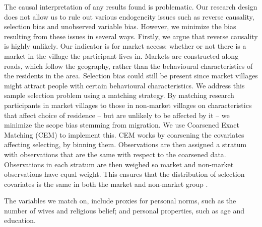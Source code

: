 The causal interpretation of any results found is problematic. Our research design does not allow us to  rule out various endogeneity issues such as reverse causality, selection bias and unobserved variable bias. However, we minimize the bias resulting from these issues in several ways. Firstly, we argue that reverse causality is highly unlikely. Our indicator is for market access: whether or not there is a market in the village the participant lives in. Markets are constructed along roads, which follow the geography, rather than the behavioural characteristics of the residents in the area. Selection bias could still be present since market villages might attract people with certain behavioural characteristics. We address this sample selection problem using a matching strategy. By matching research participants in market villages to those in non-market villages on characteristics that affect choice of residence -- but are unlikely to be affected by it -- we minimize the scope bias stemming from migration. We use  Coarsened Exact Matching (CEM) to implement this. CEM works by coarsening the covariates affecting selecting, by binning them. Observations are then assigned a stratum with observations that are the same with respect to the coarsened data. Observations in each stratum are then weighed so market and non-market observations have equal weight. This ensures that the distribution of selection covariates is the same in both the market and non-market group \citep[for a full review of the advantages of CEM over other matching procedures such as Propensity Score Matching, see ][]{Iacus2012}.

The variables we match on, include proxies for personal norms, such as the number of wives and religious belief; and personal properties, such as age and education. 






